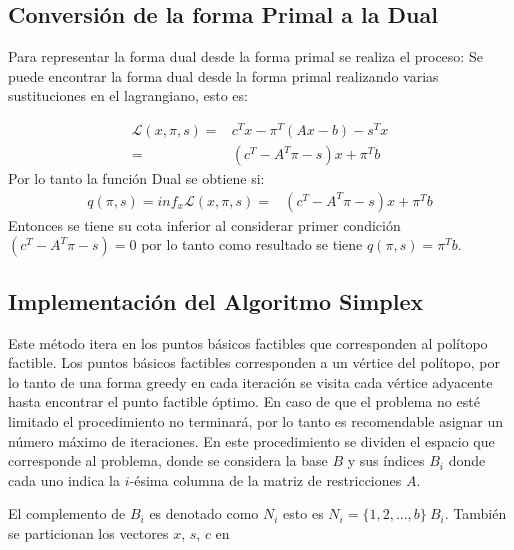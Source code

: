 \subsection{Conversión de la forma Primal a la Dual}

Para representar la forma dual desde la forma primal se realiza el proceso:
Se puede encontrar la forma dual desde la forma primal realizando varias sustituciones en el lagrangiano, esto es:

\begin{equation}
\begin{split}
\mathcal{L}(x, \pi, s) =& c^T x - \pi^T ( Ax - b) - s^T x \\
=& (c^T - A^T \pi - s) x + \pi^T b  
\end{split}
\end{equation}
Por lo tanto la función Dual se obtiene si:
\begin{equation}
\begin{split}
q(\pi, s) = inf_x \mathcal{L}(x, \pi, s)=& (c^T - A^T \pi - s) x + \pi^T b  
\end{split}
\end{equation}
Entonces se tiene su cota inferior al considerar primer condición $(c^T - A^T \pi - s) = 0$ por lo tanto como resultado se tiene $q(\pi, s) = \pi^T b$.
%

\subsection{Implementación del Algoritmo Simplex}
Este método itera en los puntos básicos factibles que corresponden al polítopo factible.
%
Los puntos básicos factibles corresponden a un vértice del polítopo, por lo tanto de una forma greedy en cada iteración se visita cada vértice adyacente hasta encontrar el punto factible óptimo.
%
En caso de que el problema no esté limitado el procedimiento no terminará, por lo tanto es recomendable asignar un número máximo de iteraciones.
%
En este procedimiento se dividen el espacio que corresponde al problema, donde se considera la base $B$ y sus índices $B_i$ donde cada uno indica la $i$-ésima columna de la matriz de restricciones $A$. 
%

El complemento de $B_i$ es denotado como $N_i$ esto es $N_i = \{1,2,...,b \} \ B_i$.
%
También se particionan los vectores $x$, $s$, $c$ en 

